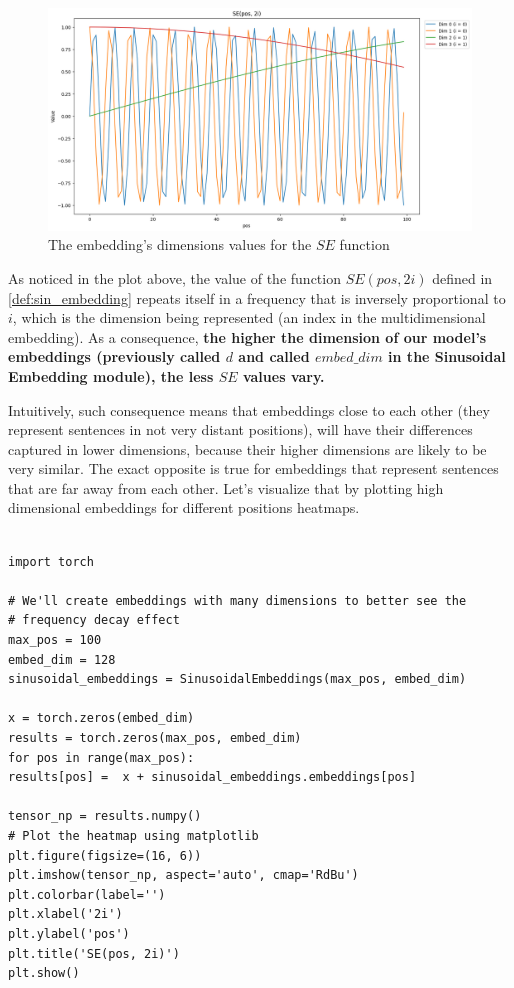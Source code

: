 \documentclass{article}
\begin{document}
\begin{figure}[h] 
	\centering
	\includegraphics[width=\linewidth]{images/sin_embeds_periodicity.png}
	\caption{The embedding's dimensions values for the $SE$ function }
	\label{fig:sin_embeds_periodicity}
\end{figure}

As noticed in the plot above, the value of the function $SE(pos, 2i)$ defined in \ref{def:sin_embedding} repeats itself in a frequency that is inversely proportional to $i$, which is the dimension being represented (an index in the multidimensional embedding). As a consequence, \textbf{the higher the dimension of our model's embeddings (previously called $d$ and called $embed\_dim$ in the Sinusoidal Embedding module), the less $SE$ values vary.} 

Intuitively, such consequence means that embeddings close to each other (they represent sentences in not very distant positions), will have their differences captured in lower dimensions, because their higher dimensions are likely to be very similar. The exact opposite is true for embeddings that represent sentences that are far away from each other. Let's visualize that by plotting high dimensional embeddings for different positions heatmaps.


\begin{lstlisting}[caption={Generating the plot of the sinusoidal embeddings for different positions}]
	
import torch

# We'll create embeddings with many dimensions to better see the 
# frequency decay effect
max_pos = 100
embed_dim = 128
sinusoidal_embeddings = SinusoidalEmbeddings(max_pos, embed_dim)

x = torch.zeros(embed_dim)
results = torch.zeros(max_pos, embed_dim)
for pos in range(max_pos):
results[pos] =  x + sinusoidal_embeddings.embeddings[pos]

tensor_np = results.numpy()
# Plot the heatmap using matplotlib
plt.figure(figsize=(16, 6))
plt.imshow(tensor_np, aspect='auto', cmap='RdBu')
plt.colorbar(label='')
plt.xlabel('2i')
plt.ylabel('pos')
plt.title('SE(pos, 2i)')
plt.show()
\end{lstlisting}
\end{document}
